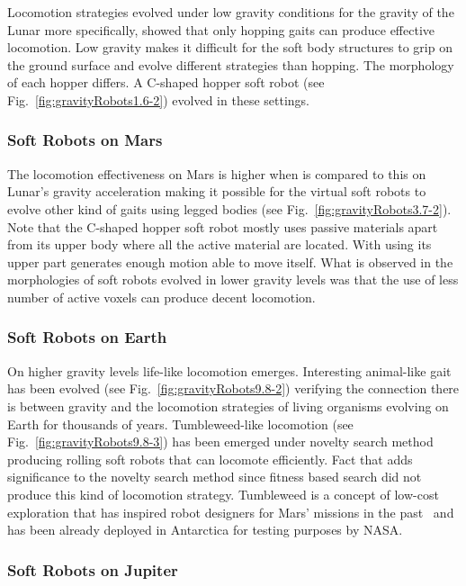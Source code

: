 \documentclass{sig-alternate}
\begin{document}
Locomotion strategies evolved under low gravity conditions for the gravity of the Lunar more specifically, showed that only hopping gaits can produce effective locomotion. Low gravity makes it difficult for the soft body structures to grip on the ground surface and evolve different strategies than hopping. The morphology of each hopper differs. A C-shaped hopper soft robot (see Fig.~\ref{fig:gravityRobots1.6-2}) evolved in these settings.

\subsubsection*{Soft Robots on Mars}

The locomotion effectiveness on Mars is higher when is compared to this on Lunar's gravity acceleration making it possible for the virtual soft robots to evolve other kind of gaits using legged bodies (see Fig.~\ref{fig:gravityRobots3.7-2}). Note that the C-shaped hopper soft robot mostly uses passive materials apart from its upper body where all the active material are located. With using its upper part generates enough motion able to move itself. What is observed in the morphologies of soft robots evolved in lower gravity levels was that the use of less number of active voxels can produce decent locomotion.

\subsubsection*{Soft Robots on Earth}

On higher gravity levels life-like locomotion emerges. Interesting animal-like gait has been evolved (see Fig.~\ref{fig:gravityRobots9.8-2}) verifying the connection there is between gravity and the locomotion strategies of living organisms evolving on Earth for thousands of years. Tumbleweed-like locomotion (see Fig.~\ref{fig:gravityRobots9.8-3}) has been emerged under novelty search method producing rolling soft robots that can locomote efficiently. Fact that adds significance to the novelty search method since fitness based search did not produce this kind of locomotion strategy. Tumbleweed is a concept of low-cost exploration that has inspired robot designers for Mars' missions in the past~\cite{antol2003low} and has been already deployed in Antarctica for testing purposes by NASA.

\subsubsection*{Soft Robots on Jupiter}
\end{document}
